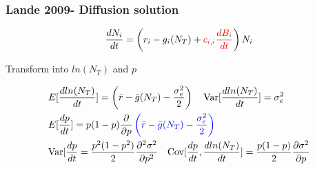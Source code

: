 \documentclass{beamer}
\begin{document}
\begin{frame}
\frametitle{Lande 2009- Diffusion solution}
\begin{equation*}
\frac{dN_i}{dt}=\left(r_i-g_i(N_T)+\begingroup\color{red}c_{i,i}\frac{dB_i}{dt}\endgroup\right)N_i
\end{equation*}
\begin{center}
Transform into \(ln(N_T)\) and \(p\)
\end{center}
\scriptsize
\begin{equation*}
\begin{aligned}
&E[\frac{d ln(N_T)}{dt}]=\left(\bar{r}-\bar{g}(N_T)-\frac{\sigma_e^2}{2}\right)\quad\text{Var}[\frac{d ln(N_T)}{dt}]=\sigma_e^2 \\
&E[\frac{dp}{dt}]=p(1-p) \frac{\partial}{\partial p} \begingroup\color{blue}\left(\bar{r}-\bar{g}(N_T)-\frac{\sigma_e^2}{2}\right)\endgroup\\
&\text{Var}[\frac{dp}{dt}=\frac{p^2(1-p^2)}{2}\frac{\partial^2 \sigma^2}{\partial p^2}\quad\text{Cov}[\frac{dp}{dt},\frac{dln(N_T)}{dt}]=\frac{p(1-p)}{2}\frac{\partial \sigma^2}{\partial p}
\end{aligned}
\end{equation*}
\normalsize
\end{frame}
\end{document}
